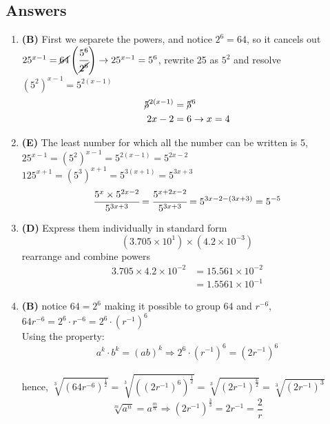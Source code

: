 \subsection{Answers}
\begin{multicols}{2}
\begin{enumerate}[label={\arabic*.}]
    \item \textbf{(B)} First we separete the powers, and notice $2^6 = 64$, so it cancels out \\
    $25^{x-1} = \cancel{64} \left(\cfrac{5^6}{\cancel{2^6}}\right) \rightarrow 25^{x-1} = 5^6$, rewrite 25 as $5^2$ and resolve $(5^2)^{x-1} = 5^{2(x-1)}$
    \begin{align*} 
        \cancel{5}^{2(x-1)} &= \cancel{5}^6 \\
        2x - 2 &= 6 \rightarrow x = 4
    \end{align*}
    \item \textbf{(E)} The least number for which all the number can be written is 5, \\
    $25^{x-1} = (5^2)^{x-1} = 5^{2(x-1)} = 5^{2x - 2} $  \\ $125^{x+1} = (5^3)^{x+1} = 5^{3(x+1)} = 5^{3x + 3}$ 
        $$\cfrac{5^x \times 5^{2x-2}}{5^{3x+3}} = \cfrac{5^{x + 2x -2}}{5^{3x + 3}} = 5^{3x - 2 -(3x + 3)} = 5^{-5}$$
    \item \textbf{(D)} Express them individually in standard form 
    $$(3.705 \times 10^1) \times (4.2 \times 10^{-3})$$ 
    rearrange and combine powers
    \begin{align*} 
        3.705 \times 4.2  \times 10^{-2} &= 15.561 \times 10^{-2} \\
        & = 1.5561 \times 10^{-1}
    \end{align*}

    \item \textbf{(B)} notice $64 = 2^6$ making it possible to group $64$ and $r^{-6}$, $64r^{-6} = 2^6\cdot r^{-6} = 2^6 \cdot (r^{-1})^6 $ \\
    Using the property: $$a^k \cdot b^k = (ab)^k \Rightarrow 2^6 \cdot (r^{-1})^6 = (2r^{-1})^6$$ \\
    hence, $\sqrt[3]{(64r^{-6})^{\frac{1}{2}}} = \sqrt[3]{((2r^{-1})^6)^{\frac{1}{2}}} = \sqrt[3]{(2r^{-1})^{\frac{6}{2}}}  = \sqrt[3]{(2r^{-1})^3}$ \\
    $$\sqrt[m]{a^{n}} = a^{\frac{m}{n}} \Rightarrow (2r^{-1})^{\frac{3}{3}} = 2r^{-1} = \frac{2}{r} $$


\end{enumerate}
\end{multicols}
